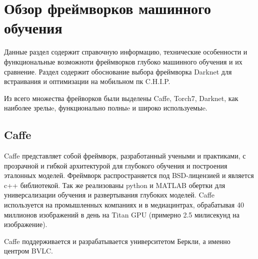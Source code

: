 \documentclass[a4paper,english,russian]{G2-105}
\begin{document}
\chapter{Обзор фреймворков машинного обучения}
\par Данные раздел содержит справочную информацию, технические особенности и функциональные возможноти фреймворков глубоко машинного обучения и их сравнение. Раздел содержит обоснование выбора фреймворка Darknet для встраивания и оптимизации на мобильном пк C.H.I.P.
\par Из всего множества фрейворков были выделены Caffe, Torch7, Darknet, как наиболее зрелыe, функционально полныe и широко используемыe.
\section{Caffe}
\par Caffe представляет собой фреймворк, разработанный учеными и практиками, с прозрачной и гибкой архитектурой для глубокого обучения и построения эталонных моделей. Фреймворк распространяется под BSD-лицензией и является c++ библиотекой. Так же реализованы python и MATLAB обертки для универсализации обучения и развертывания глубоких моделей. Caffe используется на промышленных компаниях и в медиацинтрах, обрабатывая 40 миллионов изображений в день на Titan GPU (примерно 2.5 милисекунд на изображение).
\par Caffe поддерживается и разрабатывается университетом Беркли, а именно центром BVLC.
\end{document}
